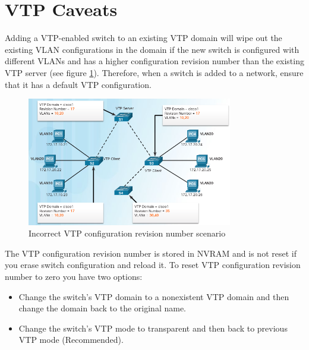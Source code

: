 \section{VTP Caveats}
Adding a VTP-enabled switch to an existing VTP domain will wipe out the existing VLAN configurations in the domain if the new switch is configured with different VLANs and has a higher configuration revision number than the existing VTP server (see figure \ref{VTP-caveats}). Therefore, when a switch is added to a network, ensure that it has a default VTP configuration.
\begin{figure}[hbtp]
\centering
\includegraphics[width=0.8\textwidth]{pictures/VTP-caveats.png}
\caption{Incorrect VTP configuration revision number scenario}
\label{VTP-caveats}
\end{figure}
The VTP configuration revision number is stored in NVRAM and is not reset if you erase switch configuration and reload it. To reset VTP configuration revision number to zero you have two options:
\begin{itemize}
\item Change the switch's VTP domain to a nonexistent VTP domain and then change the domain back to the original name.
\item Change the switch's VTP mode to transparent and then back to previous VTP mode (Recommended).
\end{itemize}

